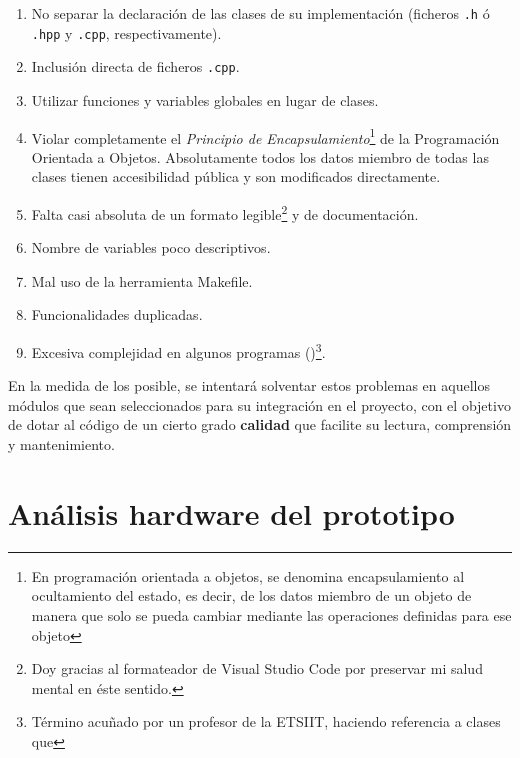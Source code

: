 \begin{enumerate} \label{sec:errores}
 \item No separar la declaración de las clases de su implementación (ficheros \texttt{.h} ó \texttt{.hpp} y \texttt{.cpp}, respectivamente).

 \item Inclusión directa de ficheros \texttt{.cpp}.

 \item Utilizar funciones y variables globales en lugar de clases.

 \item Violar completamente el \textit{Principio de Encapsulamiento}\footnote{En programación orientada a objetos, se denomina encapsulamiento al ocultamiento del estado, es decir, de los datos miembro de un objeto de manera que solo se pueda cambiar mediante las operaciones definidas para ese objeto} de la Programación Orientada a Objetos. Absolutamente todos los datos miembro de todas las clases tienen accesibilidad pública y son modificados directamente.

 \item Falta casi absoluta de un formato legible\footnote{Doy gracias al formateador de Visual Studio Code por preservar mi salud mental en éste sentido.} y de documentación.

 \item Nombre de variables poco descriptivos.

 \item Mal uso de la herramienta Makefile.

 \item Funcionalidades duplicadas.

 \item Excesiva complejidad en algunos programas ()\footnote{Término acuñado por un profesor de la ETSIIT, haciendo referencia a clases que }.
\end{enumerate}

En la medida de los posible, se intentará solventar estos problemas en aquellos módulos que sean seleccionados para su integración en el proyecto, con el objetivo de dotar al código de un cierto grado \textbf{calidad} que facilite su lectura, comprensión y mantenimiento.

\section{Análisis hardware del prototipo}

